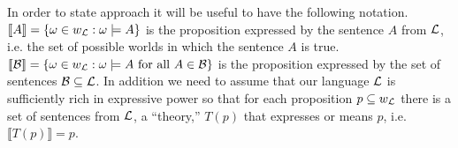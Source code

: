In order to state  approach it will be useful to have the following notation. $\llbracket A\rrbracket=\left\{\omega\in w_{\cal L}:\omega\models A\right\}$ is the proposition expressed by the sentence $A$ from $\cal L$, i.e. the set of possible worlds in which the sentence $A$ is true. %
$\llbracket\begin{cal}B\end{cal}\rrbracket=\left\{\omega\in w_{\cal L}:\omega\models A\mbox{ for all }A\in\begin{cal}B\end{cal}\right\}$ is the proposition expressed by the set of sentences $\cal B\subseteq L$. %
In addition we need to assume that our language $\cal L$ is sufficiently rich in expressive power so that for each proposition $p\subseteq w_{\cal L}$ there is a set of sentences from $\cal L$, a ``theory,'' $T\left(p\right)$ that expresses or means $p$, i.e. $\llbracket T\left(p\right)\rrbracket=p$.

